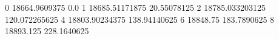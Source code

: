 0 18664.9609375 0.0
1 18685.51171875 20.55078125
2 18785.033203125 120.072265625
4 18803.90234375 138.94140625
6 18848.75 183.7890625
8 18893.125 228.1640625
